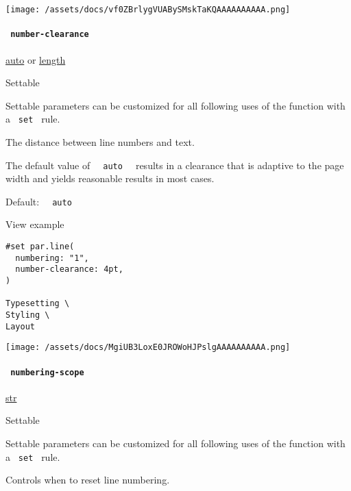 \texttt{[image: /assets/docs/vf0ZBrlygVUABySMskTaKQAAAAAAAAAA.png]}

\paragraph{\texorpdfstring{\texttt{\ number-clearance\ }}{ number-clearance }}\label{definitions-line-number-clearance}

\href{/docs/reference/foundations/auto/}{auto} {or}
\href{/docs/reference/layout/length/}{length}

{{ Settable }}

\label{definitions-line-number-clearance-settable-tooltip}
Settable parameters can be customized for all following uses of the
function with a \texttt{\ set\ } rule.

The distance between line numbers and text.

The default value of \texttt{\ }{\texttt{\ auto\ }}\texttt{\ } results
in a clearance that is adaptive to the page width and yields reasonable
results in most cases.

Default: \texttt{\ }{\texttt{\ auto\ }}\texttt{\ }


View example

\begin{verbatim}
#set par.line(
  numbering: "1",
  number-clearance: 4pt,
)

Typesetting \
Styling \
Layout
\end{verbatim}

\texttt{[image: /assets/docs/MgiUB3LoxE0JROWoHJPslgAAAAAAAAAA.png]}

\paragraph{\texorpdfstring{\texttt{\ numbering-scope\ }}{ numbering-scope }}\label{definitions-line-numbering-scope}

\href{/docs/reference/foundations/str/}{str}

{{ Settable }}

\label{definitions-line-numbering-scope-settable-tooltip}
Settable parameters can be customized for all following uses of the
function with a \texttt{\ set\ } rule.

Controls when to reset line numbering.

